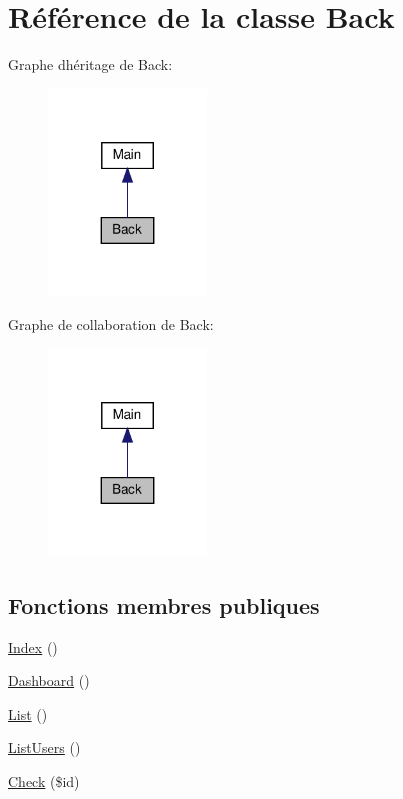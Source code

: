 \hypertarget{class_src_1_1_controllers_1_1_back}{}\section{Référence de la classe Back}
\label{class_src_1_1_controllers_1_1_back}


Graphe d\textquotesingle{}héritage de Back\+:
\nopagebreak
\begin{figure}[H]
\begin{center}
\leavevmode
\includegraphics[width=119pt]{d2/d0f/class_src_1_1_controllers_1_1_back__inherit__graph}
\end{center}
\end{figure}


Graphe de collaboration de Back\+:
\nopagebreak
\begin{figure}[H]
\begin{center}
\leavevmode
\includegraphics[width=119pt]{dd/db5/class_src_1_1_controllers_1_1_back__coll__graph}
\end{center}
\end{figure}
\subsection*{Fonctions membres publiques}
\begin{DoxyCompactItemize}
\item 
\hyperlink{class_src_1_1_controllers_1_1_back_ac36db983080e1b0934908febca5de2d9}{Index} ()
\item 
\hyperlink{class_src_1_1_controllers_1_1_back_a405a66825259e2e811a2011a61c2beff}{Dashboard} ()
\item 
\hyperlink{class_src_1_1_controllers_1_1_back_a17e6c90f14225bdac5c65ed915b0a2f6}{List} ()
\item 
\hyperlink{class_src_1_1_controllers_1_1_back_abfd4f6736a8cd4dc4fa1e012996f4a23}{List\+Users} ()
\item 
\hyperlink{class_src_1_1_controllers_1_1_back_a384a1ec9e22b88a73de48023bb2bbf4f}{Check} (\$id)
\end{DoxyCompactItemize}
